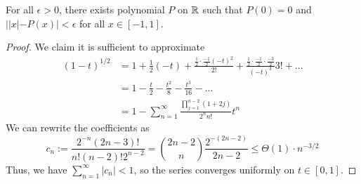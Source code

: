 \begin{theorem}
    For all $\epsilon > 0$, there exists polynomial $P$ on $\operatorname{\mathbb{R}}$ such that
    $P(0) = 0$ and $||x| - P(x)| < \epsilon$ for all $x \in [-1, 1]$.
    \begin{proof}
        We claim it is sufficient to approximate
        \begin{align*}
            (1-t)^{1/2} &= 1 + \frac{1}{2}(-t) + \frac{\frac{1}{2} \cdot \frac{-1}{2} (-t)^2}{2!} + \frac{\frac{1}{2} \cdot \frac{-1}{2} \cdot \frac{-3}{2}}{(-t)^3}{3!} + \dots \\
            &= 1 - \frac{t}{2} - \frac{t^2}{8} - \frac{t^3}{16} -\dots \\
            &= 1 - \sum_{n = 1}^{\infty} \frac{\prod_{j = 1}^{n - 2} (1 + 2j)}{2^n n!} t^n
        \end{align*}
        We can rewrite the coefficients as 
        \[ c_n := \frac{2^{-n} (2n - 3)!}{n! (n - 2)! 2^{n - 2}} = \binom{2n - 2}{n} \frac{2^{- (2n - 2)}}{2n - 2} \le \Theta(1) \cdot n^{-3/2}\]
        Thus, we have $\sum_{n = 1}^{\infty} |c_n| < 1$, so the series converges uniformly on $t \in [0, 1]$.
    \end{proof}
\end{theorem}
